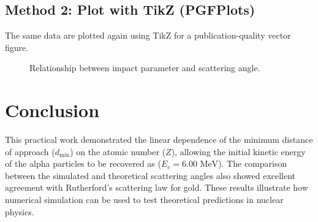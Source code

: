 \documentclass[12pt,a4paper,twoside]{article}
\begin{document}
\subsection*{Method 2: Plot with TikZ (PGFPlots)}

The same data are plotted again using TikZ for a publication-quality vector figure.

\begin{figure}[H]
\centering
{}
\caption{Relationship between impact parameter and scattering angle.}
\label{fig:diffusion_data}
\end{figure}


\section{Conclusion}
This practical work demonstrated the linear dependence of the minimum distance of approach ($d_{\min}$) on the atomic number ($Z$), allowing the initial kinetic energy of the alpha particles to be recovered as ($E_c=6.00\text{ MeV}$). The comparison between the simulated and theoretical scattering angles also showed excellent agreement with Rutherford's scattering law for gold. These results illustrate how numerical simulation can be used to test theoretical predictions in nuclear physics.
\end{document}
